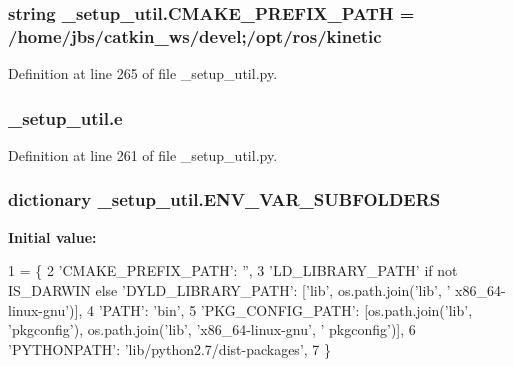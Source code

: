\subsubsection[{\texorpdfstring{C\+M\+A\+K\+E\+\_\+\+P\+R\+E\+F\+I\+X\+\_\+\+P\+A\+TH}{CMAKE_PREFIX_PATH}}]{\setlength{\rightskip}{0pt plus 5cm}string \+\_\+setup\+\_\+util.\+C\+M\+A\+K\+E\+\_\+\+P\+R\+E\+F\+I\+X\+\_\+\+P\+A\+TH = \textquotesingle{}/home/jbs/catkin\+\_\+ws/devel;/opt/ros/kinetic\textquotesingle{}}\hypertarget{namespace__setup__util_a57afd3d2c076955fb715f3e72ef098eb}{}\label{namespace__setup__util_a57afd3d2c076955fb715f3e72ef098eb}


Definition at line 265 of file \+\_\+setup\+\_\+util.\+py.

\subsubsection[{\texorpdfstring{e}{e}}]{\setlength{\rightskip}{0pt plus 5cm}\+\_\+setup\+\_\+util.\+e}\hypertarget{namespace__setup__util_acdce690b925de33d6249bbbfa1109d61}{}\label{namespace__setup__util_acdce690b925de33d6249bbbfa1109d61}


Definition at line 261 of file \+\_\+setup\+\_\+util.\+py.

\subsubsection[{\texorpdfstring{E\+N\+V\+\_\+\+V\+A\+R\+\_\+\+S\+U\+B\+F\+O\+L\+D\+E\+RS}{ENV_VAR_SUBFOLDERS}}]{\setlength{\rightskip}{0pt plus 5cm}dictionary \+\_\+setup\+\_\+util.\+E\+N\+V\+\_\+\+V\+A\+R\+\_\+\+S\+U\+B\+F\+O\+L\+D\+E\+RS}\hypertarget{namespace__setup__util_aa31804f1be8660156ce9394b33c68dc4}{}\label{namespace__setup__util_aa31804f1be8660156ce9394b33c68dc4}
{\bfseries Initial value\+:}
\begin{DoxyCode}
1 = \{
2     \textcolor{stringliteral}{'CMAKE\_PREFIX\_PATH'}: \textcolor{stringliteral}{''},
3     \textcolor{stringliteral}{'LD\_LIBRARY\_PATH'} \textcolor{keywordflow}{if} \textcolor{keywordflow}{not} IS\_DARWIN \textcolor{keywordflow}{else} \textcolor{stringliteral}{'DYLD\_LIBRARY\_PATH'}: [\textcolor{stringliteral}{'lib'}, os.path.join(\textcolor{stringliteral}{'lib'}, \textcolor{stringliteral}{'
      x86\_64-linux-gnu'})],
4     \textcolor{stringliteral}{'PATH'}: \textcolor{stringliteral}{'bin'},
5     \textcolor{stringliteral}{'PKG\_CONFIG\_PATH'}: [os.path.join(\textcolor{stringliteral}{'lib'}, \textcolor{stringliteral}{'pkgconfig'}), os.path.join(\textcolor{stringliteral}{'lib'}, \textcolor{stringliteral}{'x86\_64-linux-gnu'}, \textcolor{stringliteral}{'
      pkgconfig'})],
6     \textcolor{stringliteral}{'PYTHONPATH'}: \textcolor{stringliteral}{'lib/python2.7/dist-packages'},
7 \}
\end{DoxyCode}


